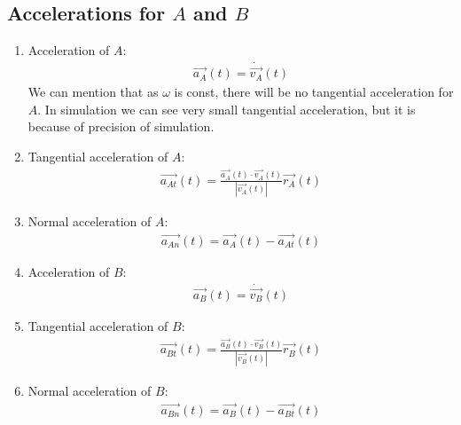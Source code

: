 \subsection{Accelerations for $A$ and $B$}

\begin{enumerate}
    \item Acceleration of $A$:
          \begin{align}
              \vec{a_A}(t) = \dot{\vec{v_A}}(t)
          \end{align}
          We can mention that as $\omega$ is const, there will be no tangential acceleration for $A$.
          In simulation we can see very small tangential acceleration, but it is because of precision of simulation.
    \item Tangential acceleration of $A$:
          \begin{align}
              \vec{a_{At}}(t) = \frac{\vec{a_A}(t) \cdot \vec{v_{A}}(t)}{|\vec{v_{A}}(t)|} \vec{r_{A}}(t)
          \end{align}
    \item Normal acceleration of $A$:
          \begin{align}
              \vec{a_{An}}(t) = \vec{a_A}(t) - \vec{a_{At}}(t)
          \end{align}
    \item Acceleration of $B$:
          \begin{align}
              \vec{a_B}(t) = \dot{\vec{v_B}}(t)
          \end{align}
    \item Tangential acceleration of $B$:
          \begin{align}
              \vec{a_{Bt}}(t) = \frac{\vec{a_B}(t) \cdot \vec{v_{B}}(t)}{|\vec{v_{B}}(t)|} \vec{r_{B}}(t)
          \end{align}
    \item Normal acceleration of $B$:
          \begin{align}
              \vec{a_{Bn}}(t) = \vec{a_B}(t) - \vec{a_{Bt}}(t)
          \end{align}
\end{enumerate}